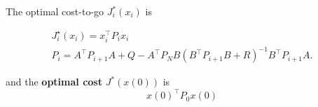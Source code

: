 The optimal cost-to-go $J_i^*(x_i)$ is

    \noindent\begin{gather*}
        J_{i}^{\star}(x_{i})  = x_{i}^{\top}P_{i}x_{i}                                    \\
        P_{i} = A^\top P_{i+1} A+Q-A^\top P_N B{(B^\top P_{i+1} B+R)}^{-1}B^\top P_{i+1} A.
    \end{gather*}

and the \textbf{optimal cost} $J^*(x(0))$ is
\noindent\begin{equation*}
    {x(0)}^\top P_0 x(0)
\end{equation*}